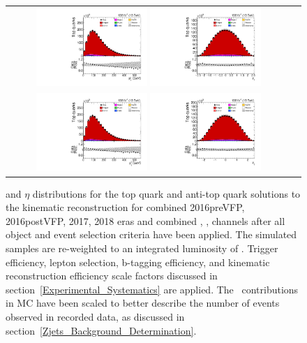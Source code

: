 \begin{figure}[htb]
    \begin{center}
        \begin{tabular}{cc}
            \includegraphics[width=0.40\textwidth]{fig_fullRun2UL/controlplots/combined/HypToppT.pdf}
            \includegraphics[width=0.40\textwidth]{fig_fullRun2UL/controlplots/combined/HypTopRapidity.pdf} \\
            \includegraphics[width=0.40\textwidth]{fig_fullRun2UL/controlplots/combined/HypAntiToppT.pdf}
            \includegraphics[width=0.40\textwidth]{fig_fullRun2UL/controlplots/combined/HypAntiTopRapidity.pdf} 
        \end{tabular}
        \caption{\footnotesize \pT and $\eta$ distributions for the top quark and anti-top quark solutions to the kinematic reconstruction for combined 2016preVFP, 2016postVFP, 2017, 2018 eras and combined \ee, \emu, \mumu channels after all object and event selection criteria have been applied.
        The simulated samples are re-weighted to an integrated luminosity of \lumivalueRuniiUL.
        Trigger efficiency, lepton selection, b-tagging efficiency, and kinematic reconstruction efficiency scale factors discussed in section~\ref{Experimental_Systematics} are applied.
        The \zjets\ contributions in MC have been scaled to better describe the number of events observed in recorded data, as discussed in section~\ref{Zjets_Background_Determination}.
        }
    \end{center}
\end{figure}

